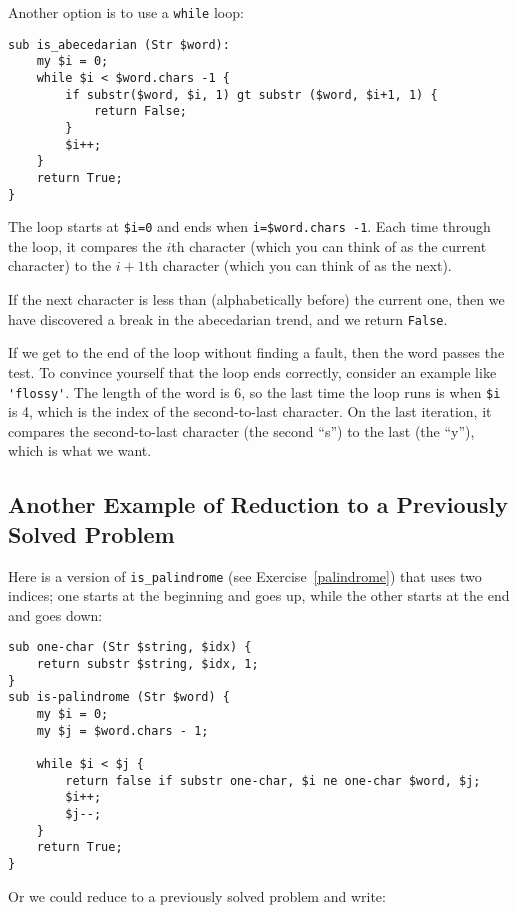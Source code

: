 Another option is to use a {\tt while} loop:

\begin{verbatim}
sub is_abecedarian (Str $word):
    my $i = 0;
    while $i < $word.chars -1 {
        if substr($word, $i, 1) gt substr ($word, $i+1, 1) {
            return False;
        }
        $i++;
    }
    return True;
}
\end{verbatim}
%
The loop starts at {\tt \$i=0} and ends when {\tt i=\$word.chars -1}.  Each
time through the loop, it compares the $i$th character (which you can
think of as the current character) to the $i+1$th character (which you
can think of as the next).

If the next character is less than (alphabetically before) the current
one, then we have discovered a break in the abecedarian trend, and
we return {\tt False}.

If we get to the end of the loop without finding a fault, then the
word passes the test.  To convince yourself that the loop ends
correctly, consider an example like \verb"'flossy'".  The
length of the word is 6, so
the last time the loop runs is when \verb'$i' is 4, which is the
index of the second-to-last character.  On the last iteration,
it compares the second-to-last character (the second ``s'') to 
the last (the ``y''), which is what we want.

\subsection{Another Example of Reduction to a Previously Solved Problem}

\label{palindrome_2}
Here is a version of \verb"is_palindrome" (see
Exercise~\ref{palindrome}) that uses two indices; one starts at the
beginning and goes up, while the other starts at the end and goes down:		

\begin{verbatim}
sub one-char (Str $string, $idx) {
    return substr $string, $idx, 1;
}
sub is-palindrome (Str $word) {
    my $i = 0;
    my $j = $word.chars - 1;

    while $i < $j {
        return false if substr one-char, $i ne one-char $word, $j;
        $i++;
        $j--;
    }
    return True;
}
\end{verbatim}

Or we could reduce to a previously solved
problem and write:

